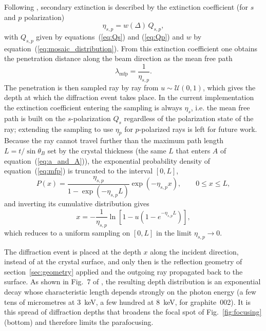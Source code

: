 \documentclass{iucr}
\begin{document}
Following \cite{zachariasen1945theory}, secondary extinction is described by the
extinction coefficient (for $s$ and $p$ polarization)
\begin{equation}
\eta_{s,p} = w(\Delta) \, Q_{s,p} ,
\label{eq:eta}
\end{equation}
with $Q_{s,p}$ given by equations~(\ref{eq:Qs}) and (\ref{eq:Qp}) and $w$ by
equation~(\ref{eq:mosaic_distribution}). From this extinction coefficient one
obtains the penetration distance along the beam direction as the mean free path
\begin{equation}
\lambda_\mathrm{mfp} = \frac{1}{\eta_{s,p}} .
\label{eq:mfp}
\end{equation}
The penetration is then sampled ray by ray from $u \sim \mathcal{U}(0,1)$, which
gives the depth at which the diffraction event takes place. In the current
implementation the extinction coefficient entering the sampling is always
$\eta_s$, i.e. the mean free path is built on the $s$-polarization $Q_s$
regardless of the polarization state of the ray; extending the sampling to use
$\eta_p$ for $p$-polarized rays is left for future work. Because the ray cannot travel further
than the maximum path length $L = t/\sin\theta_B$ set by the crystal thickness
(the same $L$ that enters $A$ of equation~(\ref{eq:a_and_A})), the exponential
probability density of equation~(\ref{eq:mfp}) is truncated to the interval
$[0, L]$,
\begin{equation}
P(x) = \frac{\eta_{s,p}}{1 - \exp(-\eta_{s,p} L)} \exp(-\eta_{s,p} x) ,
\qquad 0 \le x \le L ,
\label{eq:penetration_pdf}
\end{equation}
and inverting its cumulative distribution gives
\begin{equation}
x = -\frac{1}{\eta_{s,p}} \ln\!\left[ 1 - u \left( 1 - e^{-\eta_{s,p} L} \right) \right] ,
\label{eq:penetration_sampling}
\end{equation}
which reduces to a uniform sampling on $[0, L]$ in the limit $\eta_{s,p} \to 0$.

The diffraction event is placed at the depth $x$ along the incident direction,
instead of at the crystal surface, and only then is the reflection geometry of
section~\ref{sec:geometry} applied and the outgoing ray propagated back to the
surface. As shown in Fig.~7 of \cite{mosaicsSanchezDelRio1992}, the resulting depth
distribution is an exponential decay whose characteristic length depends strongly
on the photon energy (a few tens of micrometres at 3~keV, a few hundred at 8~keV,
for graphite~002). It is this spread of diffraction depths that broadens the focal
spot of Fig.~\ref{fig:focusing} (bottom) and therefore limits the parafocusing.
\end{document}
